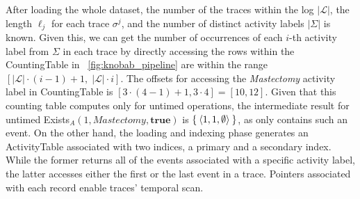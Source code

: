 After loading the whole dataset, the number of the traces within the log $|\mathcal{L}|$, the length $\ell_j$ for each trace $\sigma^j$, and the number of distinct activity labels $|\Sigma|$ is known. Given this, we can get the number of occurrences of each $i$-th activity label from $\Sigma$ in each trace by directly accessing the rows within the \textsf{CountingTable} in \figurename~\ref{fig:knobab_pipeline} are within the range $[|\mathcal{L}|\cdot (i-1) + 1,\; |\mathcal{L}|\cdot i]$. The offsets for accessing the \textit{Mastectomy} activity label in \textsf{CountingTable} is $[3 \cdot (4-1) + 1, 3 \cdot 4] = [10,12]$. Given that this counting table computes only for untimed operations, the intermediate result for untimed \textsf{Exists}$_A(1,\textit{Mastectomy},\textbf{true})$ is $\Set{\braket{1,1,\emptyset}}$, as only  contains such an event.
%
On the other hand, the loading and indexing phase generates an \textsf{ActivityTable} associated with two indices, a primary and a secondary index. While the former returns all of the events associated with a specific activity label, the latter accesses either the first or the last event in a trace. Pointers associated with each record enable  traces' temporal scan. 



